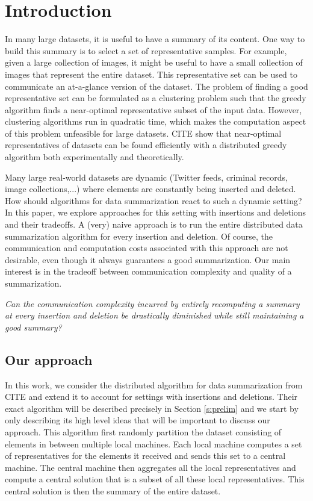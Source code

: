 \section{Introduction}

In many large datasets, it is useful to have a summary of its content. One way to build this summary is to select a set of representative samples. For example, given a large collection of images, it might be useful to have a small collection of images that represent the entire dataset. This representative set can be used to communicate an at-a-glance version of the dataset. The problem of finding a good representative set can be formulated as a clustering problem such that the greedy algorithm finds a near-optimal representative subset of the input data. However, clustering algorithms run in quadratic time, which makes the computation aspect of this problem unfeasible for large datasets. CITE show that near-optimal representatives of datasets can be found efficiently with a distributed greedy algorithm both experimentally and theoretically.

Many large real-world datasets are dynamic (Twitter feeds, criminal records, image collections,...) where elements are constantly being inserted and deleted. How should algorithms for data summarization react to such a dynamic setting? In this paper, we explore approaches for this setting with insertions and deletions and their tradeoffs. A (very) naive approach is to run the entire distributed data summarization algorithm for every insertion and deletion. Of course, the communication and computation costs associated with this approach are not desirable, even though it always guarantees a good summarization. Our main interest is in the tradeoff between communication complexity and quality of a summarization. 

\begin{center}
\textit{Can the communication complexity incurred by entirely recomputing a summary at every insertion and deletion be drastically diminished while still maintaining a good summary?}
\end{center}

	
	
	\subsection{Our approach}
	
	In this work, we consider the distributed algorithm for data summarization from CITE and extend it to account for settings with insertions and deletions. Their exact algorithm will be described precisely in Section \ref{s:prelim} and we start by only describing its high level ideas that will be important to discuss our approach. This algorithm first randomly partition the dataset consisting of elements in between multiple local machines. Each local machine computes a set of representatives for the elements it received and sends this set to a central machine. The central machine then aggregates all the local representatives and compute a central solution that is a subset of all these local representatives. This central solution is then the summary of the entire dataset.
	
